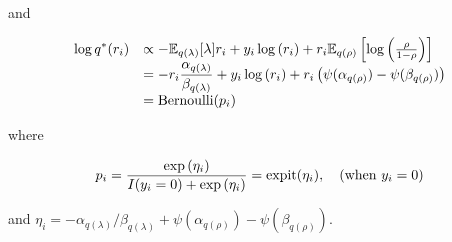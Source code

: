 \documentclass[11pt]{amsart}
\begin{document}
\noindent and

$$
\begin{array}{rl}
	\ds \log{q^*(r_i)} & \propto -\bE_{q(\lambda)} [\lambda ] r_i + y_i \log{(r_i)} + r_i \bE_{q(\rho)} \left[\log{\left(\frac{\rho}{1 - \rho}\right)}\right]          \\[0.5ex]
	                   & \ds = -r_i \frac{\alpha_{q(\lambda)}}{\beta_{q(\lambda)}} + y_i \log{(r_i)} + r_i \left(\psi(\alpha_{q(\rho)}) - \psi(\beta_{q(\rho)})\right) \\ [0.5ex]%
	                   & \ds = \text{Bernoulli}(p_i)                                                                                                                   
\end{array}
$$

\noindent where

$$
\begin{array}{rl}
	\displaystyle p_i                                               
	= \frac{\exp{(\eta_i)}}{I(y_i = 0) + \exp{(\eta_i)}}  
	= \text{expit}(\eta_i), \quad \mbox{(when $y_i = 0$)} 
\end{array}
$$

\noindent and $\eta_i = - \alpha_{q(\lambda)}/\beta_{q(\lambda)} + \psi(\alpha_{q(\rho)}) - \psi(\beta_{q(\rho)})$.
%
%
%
%
%
%
%
%
%
\end{document}
